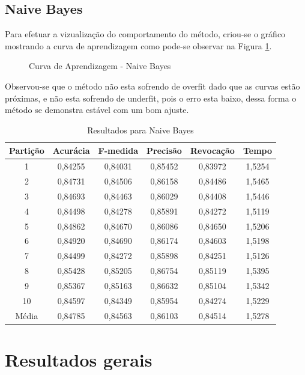 \subsection{Naive Bayes}
	
Para efetuar a vizualização do comportamento do método, criou-se o gráfico mostrando a curva de aprendizagem como pode-se observar na Figura \ref{fig:NaiveBayes}.

\begin{figure}[h]
	\centering
{}
\caption{Curva de Aprendizagem - Naive Bayes}
\label{fig:NaiveBayes}
\end{figure}

Observou-se que o método não esta sofrendo de overfit dado que as curvas estão próximas, e não esta sofrendo de underfit, pois o erro esta baixo, dessa forma o método se demonstra estável com um bom ajuste. 


\begin{table}[h]
\centering
\caption{Resultados para Naive Bayes}
\vspace{0.2cm}
\begin{tabular}{c|c|c|c|c|c}
Partição & Acurácia & F-medida & Precisão & Revocação & Tempo \\
\hline
1  & 0,84255 & 0,84031 & 0,85452 & 0,83972 & 1,5254 \\
2  & 0,84731 & 0,84506 & 0,86158 & 0,84486 & 1,5465 \\
3  & 0,84693 & 0,84463 & 0,86029 & 0,84408 & 1,5446 \\
4  & 0,84498 & 0,84278 & 0,85891 & 0,84272 & 1,5119 \\
5  & 0,84862 & 0,84670 & 0,86086 & 0,84650 & 1,5206 \\
6  & 0,84920 & 0,84690 & 0,86174 & 0,84603 & 1,5198 \\
7  & 0,84499 & 0,84272 & 0,85898 & 0,84251 & 1,5126 \\
8  & 0,85428 & 0,85205 & 0,86754 & 0,85119 & 1,5395 \\
9  & 0,85367 & 0,85163 & 0,86632 & 0,85104 & 1,5342 \\
10 & 0,84597 & 0,84349 & 0,85954 & 0,84274 & 1,5229 \\
\hline
Média & 0,84785 & 0,84563 & 0,86103 & 0,84514 & 1,5278 \\

\end{tabular} 
\label{table:resultadosNB}
\end{table}

\section{Resultados gerais}

